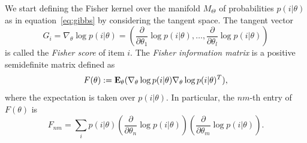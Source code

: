 We start defining the Fisher kernel over the manifold $M_\Theta$ of probabilities $p(i| \theta)$ as in equation~\eqref{eq:gibbs} by considering the tangent space.
The tangent vector 
\begin{equation}
G_i=\nabla_\theta \log p(i|\theta)=\left(
\frac{\partial}{\partial \theta_1} \log p(i|\theta), \ldots,
\frac{\partial}{\partial \theta_l} \log p(i|\theta)\right)
\label{eq:Fisher-score}
\end{equation}
is called the {\em Fisher score} of item $i$. 
The {\em Fisher information matrix} is a positive semidefinite matrix defined as
%
\begin{equation}
F(\theta):= {\bf E_{\theta}}(\nabla _\theta\log p(i|\theta)\nabla _\theta \log p(i|\theta)^T),
\label{eq:fi}
\end{equation}
%
%
%
where the expectation is taken over $p(i|\theta)$. In particular, the $nm$-th entry of 
$F(\theta)$  is 
$$ F_{nm}=\sum_{i} p(i|\theta)
\left(\frac{\partial}{\partial \theta_n} \log p(i|\theta)\right)
\left(\frac{\partial}{\partial \theta_m} \log p(i|\theta)\right).$$

